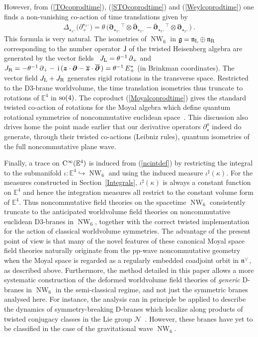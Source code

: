 \documentclass[11pt,a4paper]{article}
\DeclareMathOperator{\NW}{NW}
\newcommand{\1}{\mathbb{1}}
\newcommand{\mbf}[1]{{\boldsymbol {#1} }}
\def\ii{{\,{\rm i}\,}}
\def\CC{{\rm C}}
\def\J{{\sf J}}
\def\mz{{\mbf z}}
\def\mdell{{\mbf\partial}}
\def\mfn{{\mathfrak n}}
\def\mfg{{\mathfrak g}}
\newcommand{\eucl}{{\mathbb E}}
\newcommand{\beq}{\begin{eqnarray}}
\newcommand{\eeq}{\end{eqnarray}}
\begin{document}
However, from (\ref{TOcoprodtime}), (\ref{STOcoprodtime}) and
(\ref{Weylcoprodtime}) one finds a non-vanishing co-action of time
translations given by
\beq
\Delta_{\star_{x^+}}\bigl(\partial_+^{\star_{x^+}}\bigr)=
\theta\,\bigl(\mdell_{\star_{x^+}}{}^\top\otimes
\overline{\mdell}_{\star_{x^+}}-
\overline{\mdell}_{\star_{x^+}}{}^\top\otimes\mdell_{\star_{x^+}}\bigr) \ .
\label{Moyalcoprodtime}\eeq
This formula is very natural. The isometries of $\NW_6$
in $\mfg=\mfn_{\rm L}\oplus\mfn_{\rm R}$ corresponding to the number
operator $\J$ of the twisted Heisenberg algebra are generated by the
vector fields~\cite{HSz1} $J_{\rm L}=\theta^{-1}\,\partial_+$ and $J_{\rm
  R}=-\theta^{-1}\,\partial_+-\ii(\mz\cdot\mdell-
\overline{\mz}\cdot\overline{\mdell}\,)=\theta^{-1}\,E_+^*$ (in
Brinkman coordinates). The vector field $J_{\rm L}+J_{\rm R}$
generates rigid rotations in the transverse space. Restricted to the
D3-brane worldvolume, the time translation isometries thus truncate to
rotations of $\eucl^4$ in ${\rm so}(4)$. The coproduct
(\ref{Moyalcoprodtime}) gives the standard twisted co-action of
rotations for the Moyal algebra which define quantum rotational
symmetries of noncommutative euclidean
space~\cite{CPT1,CKNT1,Wess1}. This discussion also drives home the
point made earlier that our derivative operators $\partial_\star^a$
indeed do generate, through their twisted co-actions (Leibniz rules),
quantum isometries of the full noncommutative plane wave.

Finally, a trace on $\CC^\infty(\eucl^4)$ is induced from
(\ref{ncintdef}) by restricting the integral to the submanifold
$\iota:\eucl^4\hookrightarrow\NW_6$ and using the induced measure
$\iota^\sharp(\kappa)$. For the measures constructed in
Section~\ref{Integrals}, $\iota^\sharp(\kappa)$ is always a constant
function on $\eucl^4$ and hence the integration measures all restrict
to the constant volume form of $\eucl^4$.
Thus noncommutative field theories on the spacetime $\NW_6$ consistently
truncate to the anticipated worldvolume field theories on
noncommutative euclidean D3-branes in $\NW_6$, together with the
correct twisted implementation for the action of classical worldvolume
symmetries. The advantage of the present point of view is that many of
the novel features of these canonical Moyal space field theories
naturally originate from the pp-wave noncommutative geometry when the
Moyal space is regarded as a regularly embedded coadjoint orbit in
$\mfn^{\vee\,}$, as described above. Furthermore, the method detailed in this
paper allows a more systematic construction of the deformed
worldvolume field theories of {\it generic} D-branes in $\NW_6$ in the
semi-classical regime, and not just the symmetric branes analysed
here. For instance, the analysis can in principle be applied to
describe the dynamics of symmetry-breaking D-branes which localize
along products of twisted conjugacy classes in the Lie group
$\mathcal{N}$~\cite{Quella1}. However, these branes have yet to be
classified in the case of the gravitational wave $\NW_6$.
\end{document}
